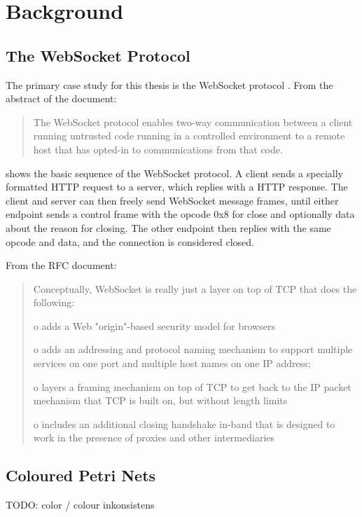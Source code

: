 \chapter{Background}
\label{chap:background}


\section{The WebSocket Protocol}
The primary case study for this thesis is the WebSocket protocol 
\cite{draft-ietf-hybi-thewebsocketprotocol}. From the abstract of the document:
\begin{quote}The WebSocket protocol enables two-way communication between a
client running untrusted code running in a controlled environment to a
remote host that has opted-in to communications from that code.
\end{quote}


 shows the basic sequence of the WebSocket protocol. A client
sends a specially formatted HTTP request to a server, which replies with a HTTP
response. The client and server can then freely send WebSocket message frames, until
either endpoint sends a control frame with the opcode 0x8 for close and
optionally data about the reason for closing. The other endpoint then replies
with the same opcode and data, and the connection is considered closed.

From the RFC document:

\begin{quote}
 Conceptually, WebSocket is really just a layer on top of TCP that
   does the following:

   o  adds a Web "origin"-based security model for browsers

   o  adds an addressing and protocol naming mechanism to support
      multiple services on one port and multiple host names on one IP
      address;

   o  layers a framing mechanism on top of TCP to get back to the IP
      packet mechanism that TCP is built on, but without length limits

   o  includes an additional closing handshake in-band that is designed
      to work in the presence of proxies and other intermediaries
\end{quote}

\section{Coloured Petri Nets}
TODO: color / colour inkonsistens

